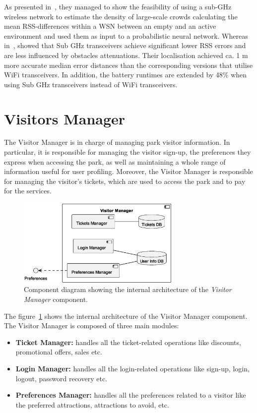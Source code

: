 As presented in~\cite{denis2018large}, they managed to show the feasibility of using a sub-GHz wireless network to estimate the
density of large-scale crowds calculating the mean RSS-differences within a WSN between an empty and an active environment and used them
as input to a probabilistic neural network.
Whereas in~\cite{fudickar2014comparing}, showed that Sub GHz transceivers achieve significant lower RSS errors and are less influenced by obstacles attenuations.
Their localisation achieved ca. 1 m more accurate median error distances than the corresponding versions that utilise WiFi transceivers.
In addition, the battery runtimes are extended by 48\% when using Sub GHz transceivers instead of WiFi transceivers.


\section{Visitors Manager}

The Visitor Manager is in charge of managing park visitor information. In particular, it is responsible for managing the visitor sign-up, the
preferences they express when accessing the park, as well as maintaining a whole range of information useful for user profiling.
Moreover, the Visitor Manager is responsible for managing the visitor's tickets, which are used to access the park and to pay for the services.

\begin{figure}[H]
	\centering
	\includegraphics[width=0.7\textwidth]{img/visitor-manager.eps}
	\caption{Component diagram showing the internal architecture of the \textit{Visitor Manager} component.
	}
	\label{fig:visitor-manager-arch}
\end{figure}

The figure~\ref{fig:visitor-manager-arch} shows the internal architecture of the Visitor Manager component. The Visitor Manager is composed of three main modules:

\begin{itemize}
	\item \textbf{Ticket Manager:} handles all the ticket-related operations like discounts, promotional offers, sales etc.
	\item \textbf{Login Manager:} handles all the login-related operations like sign-up, login, logout, password recovery etc.
	\item \textbf{Preferences Manager:} handles all the preferences related to a visitor like the preferred attractions, attractions to avoid, etc.
\end{itemize}

